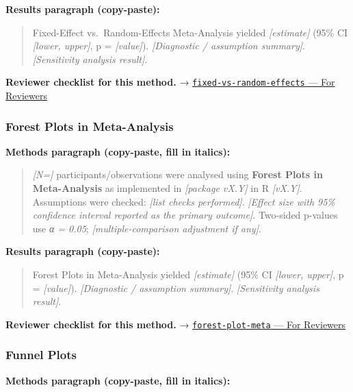 \documentclass[
]{article}
\begin{document}
\textbf{Results paragraph (copy-paste):}

\begin{quote}
Fixed-Effect vs.~Random-Effects Meta-Analysis yielded
\emph{{[}estimate{]}} (95\% CI \emph{{[}lower, upper{]}}, p =
\emph{{[}value{]}}). \emph{{[}Diagnostic / assumption summary{]}}.
\emph{{[}Sensitivity analysis result{]}}.
\end{quote}

\textbf{Reviewer checklist for this method.} →
\href{../chapters/15-metaanalysis/fixed-vs-random-effects.Rmd\#for-reviewers}{\texttt{fixed-vs-random-effects}
--- For Reviewers}

\subsubsection{Forest Plots in
Meta-Analysis}\label{forest-plots-in-meta-analysis}

\textbf{Methods paragraph (copy-paste, fill in italics):}

\begin{quote}
\emph{{[}N={]}} participants/observations were analysed using
\textbf{Forest Plots in Meta-Analysis} as implemented in
\emph{{[}package vX.Y{]}} in R \emph{{[}vX.Y{]}}. Assumptions were
checked: \emph{{[}list checks performed{]}}. \emph{{[}Effect size with
95\% confidence interval reported as the primary outcome{]}}. Two-sided
p-values use \emph{α = 0.05}; \emph{{[}multiple-comparison adjustment if
any{]}}.
\end{quote}

\textbf{Results paragraph (copy-paste):}

\begin{quote}
Forest Plots in Meta-Analysis yielded \emph{{[}estimate{]}} (95\% CI
\emph{{[}lower, upper{]}}, p = \emph{{[}value{]}}). \emph{{[}Diagnostic
/ assumption summary{]}}. \emph{{[}Sensitivity analysis result{]}}.
\end{quote}

\textbf{Reviewer checklist for this method.} →
\href{../chapters/15-metaanalysis/forest-plot-meta.Rmd\#for-reviewers}{\texttt{forest-plot-meta}
--- For Reviewers}

\subsubsection{Funnel Plots}\label{funnel-plots}

\textbf{Methods paragraph (copy-paste, fill in italics):}
\end{document}
